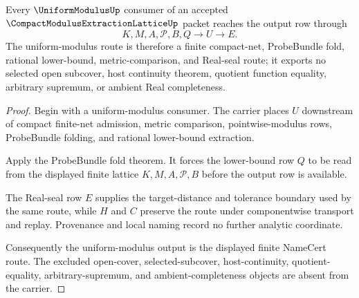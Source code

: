 \begin{theorem}
\label{thm:compact-modulus-extraction-lattice-uniform-modulus-route}
Every $\UniformModulusUp$ consumer of an accepted $\CompactModulusExtractionLatticeUp$ packet reaches the output row through
$$
K,M,A,\mathcal{P},B,Q \longrightarrow U \longrightarrow E .
$$
The uniform-modulus route is therefore a finite compact-net, ProbeBundle fold, rational lower-bound, metric-comparison, and Real-seal route; it exports no selected open subcover, host continuity theorem, quotient function equality, arbitrary supremum, or ambient Real completeness.
\end{theorem}
\begin{proof}
Begin with a uniform-modulus consumer. The carrier places $U$ downstream of compact finite-net admission, metric comparison, pointwise-modulus rows, ProbeBundle folding, and rational lower-bound extraction.

Apply the ProbeBundle fold theorem. It forces the lower-bound row $Q$ to be read from the displayed finite lattice $K,M,A,\mathcal{P},B$ before the output row is available.

The Real-seal row $E$ supplies the target-distance and tolerance boundary used by the same route, while $H$ and $C$ preserve the route under componentwise transport and replay. Provenance and local naming record no further analytic coordinate.

Consequently the uniform-modulus output is the displayed finite NameCert route. The excluded open-cover, selected-subcover, host-continuity, quotient-equality, arbitrary-supremum, and ambient-completeness objects are absent from the carrier.
\end{proof}



